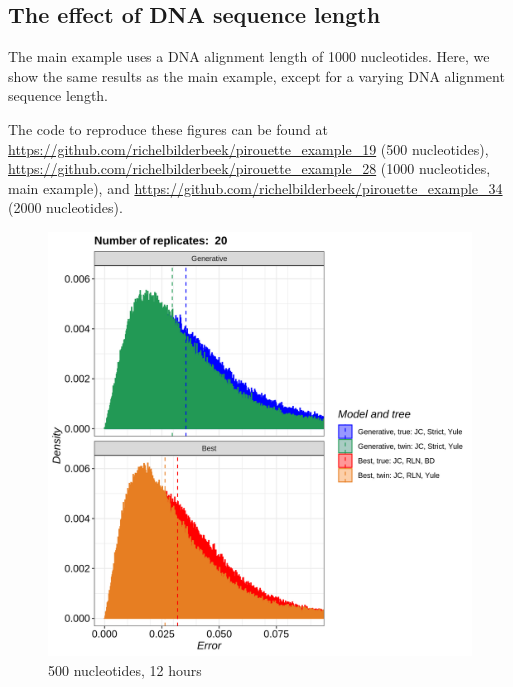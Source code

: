 \subsection{The effect of DNA sequence length}
\label{subsec:n_nucleotides}

The main example uses a DNA alignment length of 1000 nucleotides.
Here, we show the same results as the main example,
except for a varying DNA alignment sequence length.

The code to reproduce these figures can be found at  
\url{https://github.com/richelbilderbeek/pirouette_example_19} (500 nucleotides),
\url{https://github.com/richelbilderbeek/pirouette_example_28} (1000 nucleotides, main example),
and \url{https://github.com/richelbilderbeek/pirouette_example_34} (2000 nucleotides).

\begin{figure}[H]
  \includegraphics[width=\textwidth]{pirouette_example_19/errors.png}
  \caption{500 nucleotides, 12 hours}
\end{figure}

